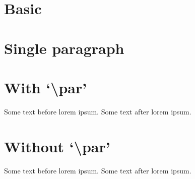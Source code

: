 \documentclass[UTF8]{ctexart}
\begin{document}
\section{Basic}
\zhlipsum

\section{Single paragraph}
\zhlipsum[55]

\section{With `\textbackslash par'}
Some text before lorem ipsum.
\zhlipsum[0-1]
Some text after lorem ipsum.

\section{Without `\textbackslash par'}
Some text before lorem ipsum.
\zhlipsum*[0-500]
Some text after lorem ipsum.
\end{document}
